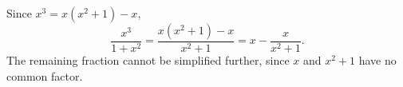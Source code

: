 Since $x^3=x(x^2+1)-x$,
\[
\dfrac{x^3}{1+x^2}=\dfrac{x(x^2+1)-x}{x^2+1}=\boxed{x-\dfrac{x}{x^2+1}}.
\]
The remaining fraction cannot be simplified further, since $x$ and $x^2+1$ have no common factor.
